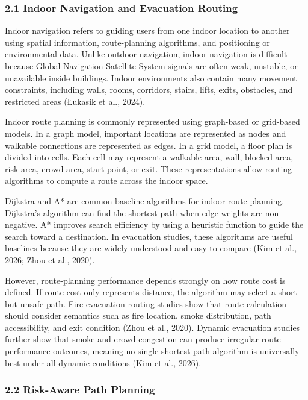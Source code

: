 \documentclass[
]{article}
\begin{document}
\subsubsection{2.1 Indoor Navigation and Evacuation
Routing}\label{indoor-navigation-and-evacuation-routing}

Indoor navigation refers to guiding users from one indoor location to
another using spatial information, route-planning algorithms, and
positioning or environmental data. Unlike outdoor navigation, indoor
navigation is difficult because Global Navigation Satellite System
signals are often weak, unstable, or unavailable inside buildings.
Indoor environments also contain many movement constraints, including
walls, rooms, corridors, stairs, lifts, exits, obstacles, and restricted
areas (Łukasik et al., 2024).

Indoor route planning is commonly represented using graph-based or
grid-based models. In a graph model, important locations are represented
as nodes and walkable connections are represented as edges. In a grid
model, a floor plan is divided into cells. Each cell may represent a
walkable area, wall, blocked area, risk area, crowd area, start point,
or exit. These representations allow routing algorithms to compute a
route across the indoor space.

Dijkstra and A* are common baseline algorithms for indoor route
planning. Dijkstra's algorithm can find the shortest path when edge
weights are non-negative. A* improves search efficiency by using a
heuristic function to guide the search toward a destination. In
evacuation studies, these algorithms are useful baselines because they
are widely understood and easy to compare (Kim et al., 2026; Zhou et
al., 2020).

However, route-planning performance depends strongly on how route cost
is defined. If route cost only represents distance, the algorithm may
select a short but unsafe path. Fire evacuation routing studies show
that route calculation should consider semantics such as fire location,
smoke distribution, path accessibility, and exit condition (Zhou et al.,
2020). Dynamic evacuation studies further show that smoke and crowd
congestion can produce irregular route-performance outcomes, meaning no
single shortest-path algorithm is universally best under all dynamic
conditions (Kim et al., 2026).

\subsubsection{2.2 Risk-Aware Path
Planning}\label{risk-aware-path-planning}
\end{document}
